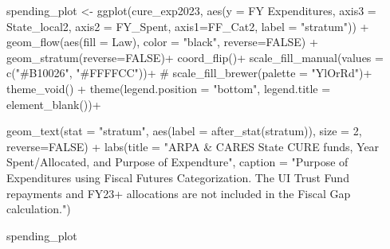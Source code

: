 \documentclass[
  letterpaper,
  DIV=11,
  numbers=noendperiod]{scrreport}
\newenvironment{Shaded}{\begin{snugshade}}{\end{snugshade}}
\newcommand{\AttributeTok}[1]{\textcolor[rgb]{0.40,0.45,0.13}{#1}}
\newcommand{\CommentTok}[1]{\textcolor[rgb]{0.37,0.37,0.37}{#1}}
\newcommand{\ConstantTok}[1]{\textcolor[rgb]{0.56,0.35,0.01}{#1}}
\newcommand{\DecValTok}[1]{\textcolor[rgb]{0.68,0.00,0.00}{#1}}
\newcommand{\FunctionTok}[1]{\textcolor[rgb]{0.28,0.35,0.67}{#1}}
\newcommand{\NormalTok}[1]{\textcolor[rgb]{0.00,0.23,0.31}{#1}}
\newcommand{\OtherTok}[1]{\textcolor[rgb]{0.00,0.23,0.31}{#1}}
\newcommand{\SpecialCharTok}[1]{\textcolor[rgb]{0.37,0.37,0.37}{#1}}
\newcommand{\StringTok}[1]{\textcolor[rgb]{0.13,0.47,0.30}{#1}}
\begin{document}
\begin{Shaded}
\begin{Highlighting}[]
\NormalTok{spending\_plot }\OtherTok{\textless{}{-}} \FunctionTok{ggplot}\NormalTok{(cure\_exp2023, }
       \FunctionTok{aes}\NormalTok{(}\AttributeTok{y =} \StringTok{\textasciigrave{}}\AttributeTok{FY Expenditures}\StringTok{\textasciigrave{}}\NormalTok{, }
           \AttributeTok{axis3 =} \StringTok{\textasciigrave{}}\AttributeTok{State\_local2}\StringTok{\textasciigrave{}}\NormalTok{, }\AttributeTok{axis2 =}\NormalTok{ FY\_Spent, }
           \AttributeTok{axis1=}\NormalTok{FF\_Cat2, }\AttributeTok{label =} \StringTok{"stratum"}\NormalTok{)) }\SpecialCharTok{+}
  \FunctionTok{geom\_flow}\NormalTok{(}\FunctionTok{aes}\NormalTok{(}\AttributeTok{fill =}\NormalTok{ Law), }\AttributeTok{color =} \StringTok{"black"}\NormalTok{, }\AttributeTok{reverse=}\ConstantTok{FALSE}\NormalTok{) }\SpecialCharTok{+}
  \FunctionTok{geom\_stratum}\NormalTok{(}\AttributeTok{reverse=}\ConstantTok{FALSE}\NormalTok{)}\SpecialCharTok{+}
  \FunctionTok{coord\_flip}\NormalTok{()}\SpecialCharTok{+}
  \FunctionTok{scale\_fill\_manual}\NormalTok{(}\AttributeTok{values =} \FunctionTok{c}\NormalTok{(}\StringTok{"\#B10026"}\NormalTok{, }\StringTok{"\#FFFFCC"}\NormalTok{))}\SpecialCharTok{+}
  \CommentTok{\# scale\_fill\_brewer(palette = "YlOrRd")+}
  \FunctionTok{theme\_void}\NormalTok{() }\SpecialCharTok{+} 
      \FunctionTok{theme}\NormalTok{(}\AttributeTok{legend.position =} \StringTok{"bottom"}\NormalTok{, }\AttributeTok{legend.title =} \FunctionTok{element\_blank}\NormalTok{())}\SpecialCharTok{+}

        \FunctionTok{geom\_text}\NormalTok{(}\AttributeTok{stat =} \StringTok{"stratum"}\NormalTok{, }\FunctionTok{aes}\NormalTok{(}\AttributeTok{label =} \FunctionTok{after\_stat}\NormalTok{(stratum)), }\AttributeTok{size =} \DecValTok{2}\NormalTok{, }\AttributeTok{reverse=}\ConstantTok{FALSE}\NormalTok{) }\SpecialCharTok{+}
  \FunctionTok{labs}\NormalTok{(}\AttributeTok{title =} \StringTok{"ARPA \& CARES State CURE funds, Year Spent/Allocated, and Purpose of Expendture"}\NormalTok{,}
       \AttributeTok{caption =} \StringTok{"Purpose of Expenditures using Fiscal Futures Categorization. }
\StringTok{       The UI Trust Fund repayments and }
\StringTok{       FY23+ allocations are not included in the Fiscal Gap calculation."}\NormalTok{)}

\NormalTok{spending\_plot}
\end{Highlighting}
\end{Shaded}
\end{document}
